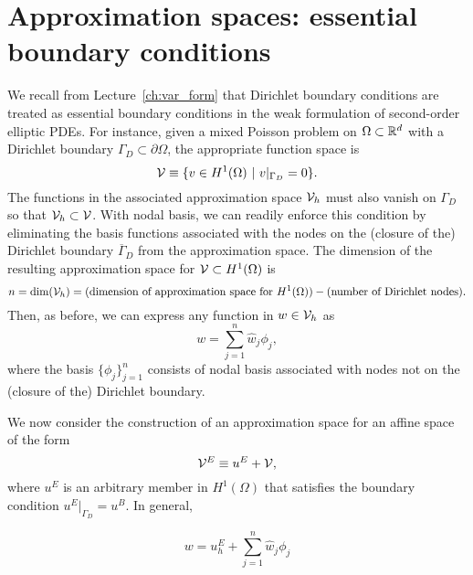 \section{Approximation spaces: essential boundary conditions}
We recall from Lecture~\ref{ch:var_form} that Dirichlet boundary conditions are treated as essential boundary conditions in the weak formulation of second-order elliptic PDEs.  For instance, given a mixed Poisson problem on $\Omega \subset \mathbb{R}^d$ with a Dirichlet boundary $\Gamma_D \subset \partial \Omega$, the appropriate function space is
\begin{equation*}
  \mathcal{V} \equiv \{ v \in H^1(\Omega) \ | \ v|_{\Gamma_D} = 0 \}.
\end{equation*}
The functions in the associated approximation space $\mathcal{V}_h$ must also vanish on $\Gamma_D$ so that $\mathcal{V}_h \subset \mathcal{V}$.  With nodal basis, we can readily enforce this condition by eliminating the basis functions associated with the nodes on the (closure of the) Dirichlet boundary $\overline \Gamma_D$ from the approximation space. The dimension of the resulting approximation space for $\mathcal{V} \subset H^1(\Omega)$ is
\begin{equation*}
  n = \text{dim}(\mathcal{V}_h) = (\text{dimension of approximation space for $H^1(\Omega)$}) - (\text{number of Dirichlet nodes}).
\end{equation*}
Then, as before, we can express any function in $w \in \mathcal{V}_h$ as
\begin{equation*}
  w = \sum_{j=1}^n \hat w_j \phi_j,
\end{equation*}
where the basis $\{ \phi_j \}_{j=1}^n$ consists of nodal basis associated with nodes not on the (closure of the) Dirichlet boundary.

We now consider the construction of an approximation space for an affine space of the form
\begin{equation*}
  \mathcal{V}^E \equiv u^E + \mathcal{V},
\end{equation*}
where $u^E$ is an arbitrary member in $H^1(\Omega)$ that satisfies the boundary condition $u^E|_{\Gamma_D} = u^B$.  In general, 


\begin{equation*}
  w = u^E_h + \sum_{j=1}^n \hat w_j \phi_j
\end{equation*}
  


